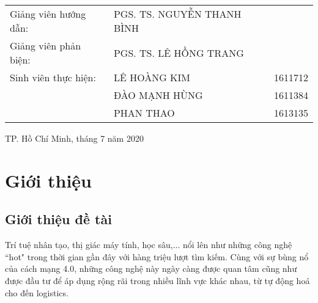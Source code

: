 \documentclass[12pt,a4paper]{article}
\begin{document}
\begin{titlepage}
		\begin{table}[h]\large
			\centering
			\begin{tabular}{lll}
				\\
				Giảng viên hướng dẫn: & PGS. TS. NGUYỄN THANH BÌNH &         \\
				Giảng viên phản biện: & PGS. TS. LÊ HỒNG TRANG & \\
				Sinh viên thực hiện:
				                              & LÊ HOÀNG KIM       & 1611712 \\
				                              & ĐÀO MẠNH HÙNG   & 1611384 \\
				                              & PHAN THAO            & 1613135
				\\
			\end{tabular}
		\end{table}

		\begin{flushleft} \large
			\vspace{5em}
			\centering
			{\footnotesize TP. Hồ Chí Minh, tháng 7 năm 2020}
		\end{flushleft}

		\vfill %

		\end{titlepage}
		\newpage
		\thispagestyle{empty}

		\tableofcontents
		\newpage
		\listoffigures
		\newpage
		\section{Giới thiệu}
		\subsection{Giới thiệu đề tài}

\indent Trí tuệ nhân tạo, thị giác máy tính, học sâu,... nổi lên như những công nghệ “hot" trong thời gian gần đây với hàng triệu lượt tìm kiếm. Cùng với sự bùng nổ của cách mạng 4.0, những công nghệ này ngày càng được quan tâm cũng như được đầu tư để áp dụng rộng rãi trong nhiều lĩnh vực khác nhau, từ tự động hoá cho đến logistics.\\
\end{document}
